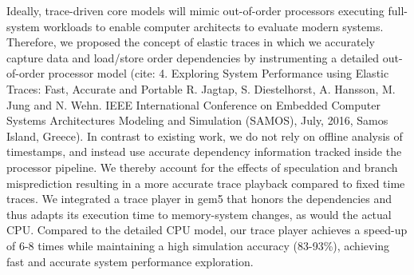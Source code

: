 Ideally, trace-driven core models will mimic out-of-order processors executing full-system workloads to enable computer architects to evaluate modern systems.
Therefore, we proposed the concept of elastic traces in which we accurately capture data and load/store order dependencies by instrumenting a detailed out-of-order processor model (cite: 4.	Exploring System Performance using Elastic Traces: Fast, Accurate and Portable R. Jagtap, S. Diestelhorst, A. Hansson, M. Jung and N. Wehn. IEEE International Conference on Embedded Computer Systems Architectures Modeling and Simulation (SAMOS), July, 2016, Samos Island, Greece).
In contrast to existing work, we do not rely on offline analysis of timestamps, and instead use accurate dependency information tracked inside the processor pipeline.
We thereby account for the effects of speculation and branch misprediction resulting in a more accurate trace playback compared to fixed time traces.
We integrated a trace player in gem5 that honors the dependencies and thus adapts its execution time to memory-system changes, as would the actual CPU. Compared to the detailed CPU model, our trace player achieves a speed-up of 6-8 times while maintaining a high simulation accuracy (83-93\%), achieving fast and accurate system performance exploration.


